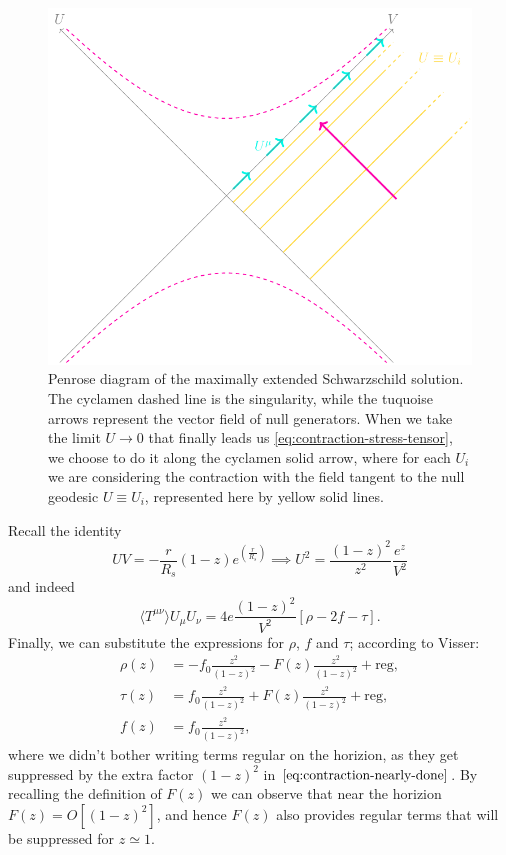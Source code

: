 \begin{figure}
    \centering
    \includegraphics[scale=1.1]{Immagini/Kruskal-extension/Kruskal-extension.pdf}
    \caption{Penrose diagram of the maximally extended Schwarzschild solution. The cyclamen dashed line is the singularity, while the tuquoise arrows represent the vector field of null generators. When we take the limit \(U\rightarrow 0\) that finally leads us \eqref{eq:contraction-stress-tensor}, we choose to do it along the cyclamen solid arrow, where for each \(U_i\) we are considering the contraction with the field tangent to the null geodesic \(U \equiv U_i\), represented here by yellow solid lines.}
    \label{fig:Penrose-diagran-Kruskal-extension}
\end{figure}
Recall the identity
\[
UV = - \frac{r}{R_s} (1 - z) e^(\frac{r}{R_s}) \implies U^2 = \frac{(1 - z)^2}{z^2}  \frac{e^z}{V^2}
\]
and indeed
\begin{equation}
    \label{eq:contraction-nearly-done}
    \langle T^{\mu\nu}\rangle U_{\mu}U_{\nu} = 4e\frac{(1 - z)^2}{V^2}\left[\rho - 2f - \tau\right]. 
\end{equation}
Finally, we can substitute the expressions for \(\rho\), \(f\) and \(\tau\); according to Visser:
\begin{align*}
    \rho(z) &= -f_0 \frac{z^2}{(1 - z)^2} - F(z) \frac{z^2}{(1 - z)^2} + \text{reg}, \\
    \tau(z) &= f_0 \frac{z^2}{(1 - z)^2} + F(z) \frac{z^2}{(1 - z)^2} + \text{reg}, \\
    f(z) &= f_0 \frac{z^2}{(1 - z)^2},
\end{align*}
where we didn't bother writing terms regular on the horizion, as they get suppressed by the extra factor \((1 - z)^2\) in \(\eqref{eq:contraction-nearly-done}\). By recalling the definition of \(F(z)\) we can observe that near the horizion \(F(z) = O[(1 - z)^2]\), and hence \(F(z)\) also provides regular terms that will be suppressed for \(z \simeq 1\).

